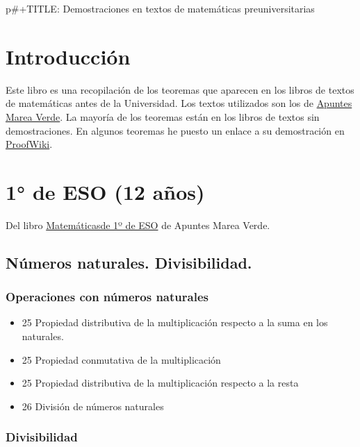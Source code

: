 \documentclass[a4paper,12pt,twoside]{book}
\author{José A. Alonso}
\date{\today}
\title{}
\theoremstyle{teorema}
\theoremstyle{remark}
\begin{document}
\tableofcontents

p\#+TITLE: Demostraciones en textos de matemáticas preuniversitarias
\chapter*{Introducción}

Este libro es una recopilación de los teoremas que aparecen en los
libros de textos de matemáticas antes de la Universidad. Los textos
utilizados son los de \href{http://www.apuntesmareaverde.org.es/}{Apuntes Marea Verde}. La mayoría de los teoremas
están en los libros de textos sin demostraciones. En algunos teoremas he
puesto un enlace a su demostración en \href{https://proofwiki.org}{ProofWiki}.

\chapter{1° de ESO (12 años)}
\label{sec:org8ae8502}

Del libro \href{http://www.apuntesmareaverde.org.es/grupos/mat/LOMLOE/1ESO/1ESO.pdf}{Matemáticasde 1º de ESO} de Apuntes Marea Verde.

\section{Números naturales. Divisibilidad.}
\label{sec:org45f37d8}

\subsection{Operaciones con números naturales}
\label{sec:org1ee72bd}

\begin{itemize}
\item 25 Propiedad distributiva de la multiplicación respecto a la suma en los naturales.

\item 25 Propiedad conmutativa de la multiplicación

\item 25 Propiedad distributiva de la multiplicación respecto a la resta

\item 26 División de números naturales
\end{itemize}

\subsection{Divisibilidad}
\label{sec:org0f757e5}
\end{document}
